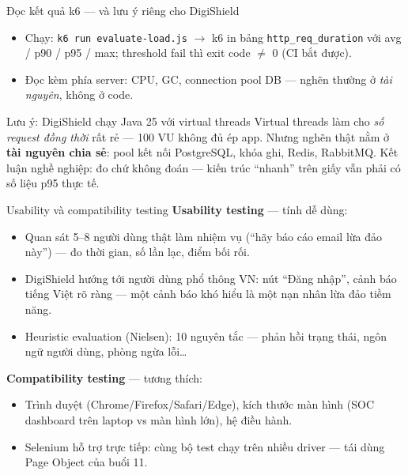 \documentclass[aspectratio=169,12pt]{beamer}
\begin{document}
\begin{frame}{Đọc kết quả k6 --- và lưu ý riêng cho DigiShield}
  \begin{itemize}
    \item Chạy: \texttt{k6 run evaluate-load.js} $\rightarrow$ k6 in bảng \texttt{http\_req\_duration} với avg / p90 / \alert{p95} / max; threshold fail thì exit code $\neq$ 0 (CI bắt được).
    \item Đọc kèm phía server: CPU, GC, connection pool DB --- nghẽn thường ở \emph{tài nguyên}, không ở code.
  \end{itemize}
  \begin{alertblock}{Lưu ý: DigiShield chạy Java 25 với virtual threads}
    Virtual threads làm cho \emph{số request đồng thời} rất rẻ --- 100 VU không đủ ép app.
    Nhưng nghẽn thật nằm ở \textbf{tài nguyên chia sẻ}: pool kết nối PostgreSQL, khóa ghi,
    Redis, RabbitMQ. Kết luận nghề nghiệp: \alert{đo chứ không đoán} --- kiến trúc ``nhanh''
    trên giấy vẫn phải có số liệu p95 thực tế.
  \end{alertblock}
\end{frame}

\begin{frame}{Usability và compatibility testing}
  \textbf{Usability testing} --- tính dễ dùng:
  \begin{itemize}
    \item Quan sát 5--8 người dùng thật làm nhiệm vụ (``hãy báo cáo email lừa đảo này'') --- đo thời gian, số lần lạc, điểm bối rối.
    \item DigiShield hướng tới người dùng phổ thông VN: nút ``Đăng nhập'', cảnh báo tiếng Việt rõ ràng --- một cảnh báo khó hiểu là một nạn nhân lừa đảo tiềm năng.
    \item Heuristic evaluation (Nielsen): 10 nguyên tắc --- phản hồi trạng thái, ngôn ngữ người dùng, phòng ngừa lỗi\ldots
  \end{itemize}
  \textbf{Compatibility testing} --- tương thích:
  \begin{itemize}
    \item Trình duyệt (Chrome/Firefox/Safari/Edge), kích thước màn hình (SOC dashboard trên laptop vs màn hình lớn), hệ điều hành.
    \item Selenium hỗ trợ trực tiếp: cùng bộ test chạy trên nhiều driver --- tái dùng Page Object của buổi 11.
  \end{itemize}
\end{frame}

\end{document}
